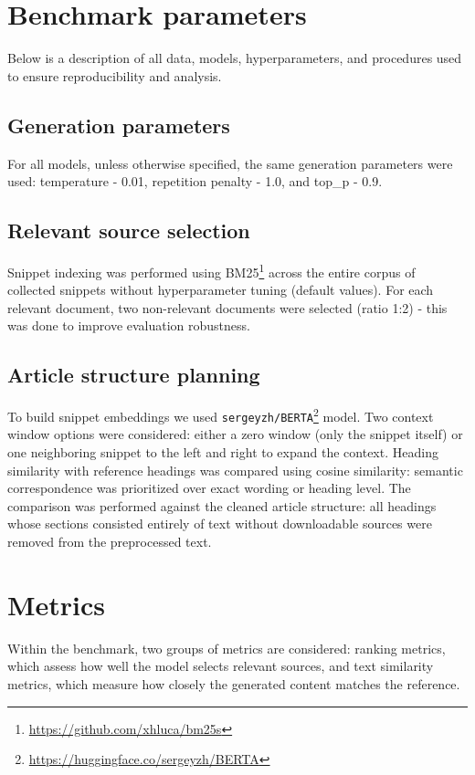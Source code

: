 \documentclass{superfri}
\begin{document}
\section{Benchmark parameters}
Below is a description of all data, models, hyperparameters, and procedures used to ensure reproducibility and analysis.

\subsection{Generation parameters}
For all models, unless otherwise specified, the same generation parameters were used: temperature - 0.01, repetition penalty - 1.0, and top\_p - 0.9.

\subsection{Relevant source selection}
Snippet indexing was performed using BM25\footnote{\url{https://github.com/xhluca/bm25s}} across the entire corpus of collected snippets without hyperparameter tuning (default values).
For each relevant document, two non-relevant documents were selected (ratio 1:2) - this was done to improve evaluation robustness.

\subsection{Article structure planning}
To build snippet embeddings we used \texttt{sergeyzh/BERTA}\footnote{\url{https://huggingface.co/sergeyzh/BERTA}} model.
Two context window options were considered: either a zero window (only the snippet itself) or one neighboring snippet to the left and right to expand the context.
Heading similarity with reference headings was compared using cosine similarity: semantic correspondence was prioritized over exact wording or heading level.
The comparison was performed against the cleaned article structure: all headings whose sections consisted entirely of text without downloadable sources were removed from the preprocessed text.

\section{Metrics}

Within the benchmark, two groups of metrics are considered: ranking metrics, which assess how well the model selects relevant sources, and text similarity metrics, which measure how closely the generated content matches the reference.
\end{document}
